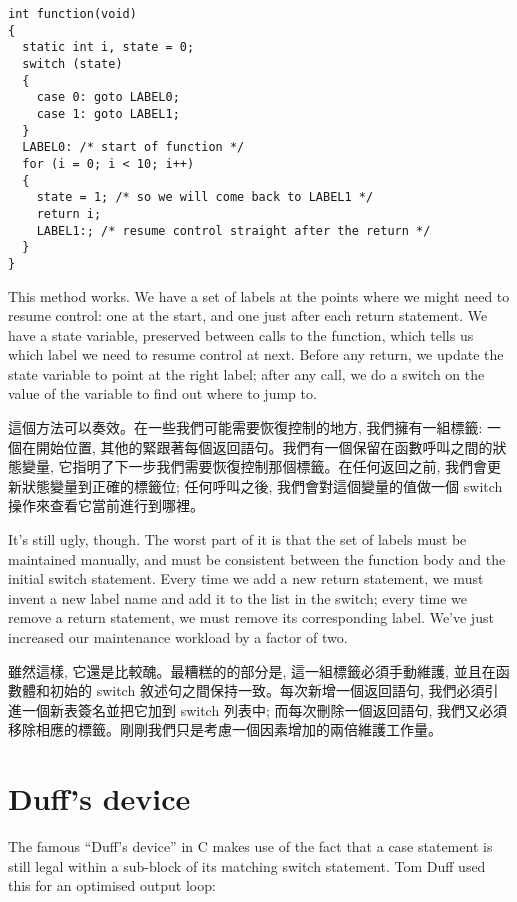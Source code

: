 \documentclass[12pt]{article}
\begin{document}
\begin{CJK}{UTF8}{bsmi}
\begin{lstlisting}[basicstyle=\footnotesize, breaklines=true]
int function(void) 
{
  static int i, state = 0;
  switch (state) 
  {
    case 0: goto LABEL0;
    case 1: goto LABEL1;
  }
  LABEL0: /* start of function */
  for (i = 0; i < 10; i++) 
  {
    state = 1; /* so we will come back to LABEL1 */
    return i;
    LABEL1:; /* resume control straight after the return */
  }
}
\end{lstlisting}

This method works. We have a set of labels at the points where we might need to resume control: one at the start, and one just after each return statement. We have a state variable, preserved between calls to the function, which tells us which label we need to resume control at next. Before any return, we update the state variable to point at the right label; after any call, we do a switch on the value of the variable to find out where to jump to.

這個方法可以奏效。在一些我們可能需要恢復控制的地方, 我們擁有一組標籤: 一個在開始位置, 其他的緊跟著每個返回語句。我們有一個保留在函數呼叫之間的狀態變量, 它指明了下一步我們需要恢復控制那個標籤。在任何返回之前, 我們會更新狀態變量到正確的標籤位;
任何呼叫之後, 我們會對這個變量的值做一個 switch 操作來查看它當前進行到哪裡。

It's still ugly, though. The worst part of it is that the set of labels must be maintained manually, and must be consistent between the function body and the initial switch statement. Every time we add a new return statement, we must invent a new label name and add it to the list in the switch; every time we remove a return statement, we must remove its corresponding label. We've just increased our maintenance workload by a factor of two.


雖然這樣, 它還是比較醜。最糟糕的的部分是, 這一組標籤必須手動維護, 並且在函數體和初始的 switch 敘述句之間保持一致。每次新增一個返回語句, 我們必須引進一個新表簽名並把它加到 switch 列表中;
而每次刪除一個返回語句, 我們又必須移除相應的標籤。剛剛我們只是考慮一個因素增加的兩倍維護工作量。

\section{Duff's device}

The famous ``Duff's device'' in C makes use of the fact that a case statement is still legal within a sub-block of its matching switch statement. Tom Duff used this for an optimised output loop: 


\end{CJK}
\end{document}

